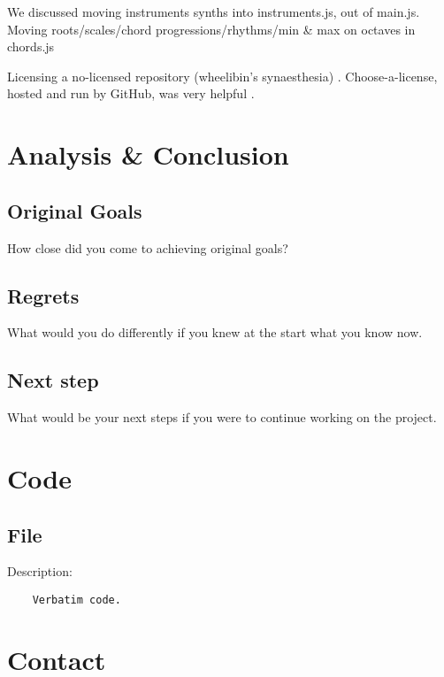 \documentclass[12pt,a4paper]{article}
\begin{document}
We discussed moving instruments synths into instruments.js, out of main.js. Moving roots/scales/chord progressions/rhythms/min \& max on octaves in chords.js

Licensing a no-licensed repository (wheelibin's synaesthesia) \cite{synaesthesia-license}. Choose-a-license, hosted and run by GitHub, was very helpful \cite{choose-license-none}.


\section{Analysis \& Conclusion}
\subsection{Original Goals}
How close did you come to achieving original goals?
\subsection{Regrets}
What would you do differently if you knew at the start what you know now. 
\subsection{Next step}
What would be your next steps if you were to continue working on the project.


\section{Code}

\subsection{File}

\begin{center}
Description:
	\begin{verbatim}
	Verbatim code.
	\end{verbatim}
\end{center}


\section{Contact}
\end{document}

